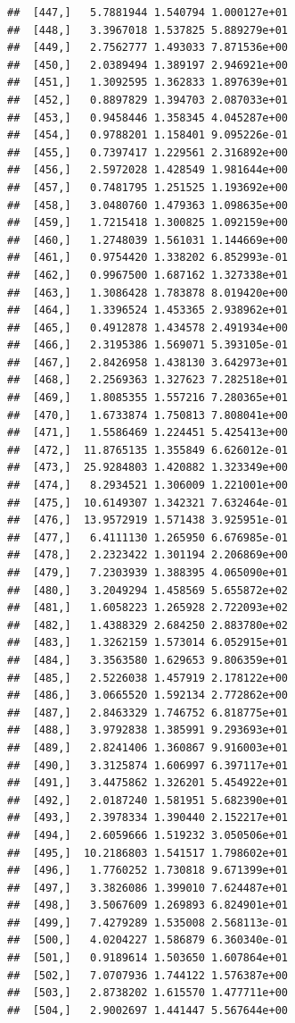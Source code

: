 \documentclass[article]{jss}\usepackage[]{graphicx}\usepackage[]{xcolor}
\makeatletter
\newenvironment{kframe}{%
 \def\at@end@of@kframe{}%
 \ifinner\ifhmode%
  \def\at@end@of@kframe{\end{minipage}}%
  \begin{minipage}{\columnwidth}%
 \fi\fi%
 \def\FrameCommand##1{\hskip\@totalleftmargin \hskip-\fboxsep
 \colorbox{shadecolor}{##1}\hskip-\fboxsep
     \hskip-\linewidth \hskip-\@totalleftmargin \hskip\columnwidth}%
 \MakeFramed {\advance\hsize-\width
   \@totalleftmargin\z@ \linewidth\hsize
   \@setminipage}}%
 {\par\unskip\endMakeFramed%
 \at@end@of@kframe}
\newenvironment{knitrout}{}{} %
\makeatother
\begin{document}
\begin{knitrout}
\begin{kframe}
\begin{verbatim}
##  [447,]   5.7881944 1.540794 1.000127e+01
##  [448,]   3.3967018 1.537825 5.889279e+01
##  [449,]   2.7562777 1.493033 7.871536e+00
##  [450,]   2.0389494 1.389197 2.946921e+00
##  [451,]   1.3092595 1.362833 1.897639e+01
##  [452,]   0.8897829 1.394703 2.087033e+01
##  [453,]   0.9458446 1.358345 4.045287e+00
##  [454,]   0.9788201 1.158401 9.095226e-01
##  [455,]   0.7397417 1.229561 2.316892e+00
##  [456,]   2.5972028 1.428549 1.981644e+00
##  [457,]   0.7481795 1.251525 1.193692e+00
##  [458,]   3.0480760 1.479363 1.098635e+00
##  [459,]   1.7215418 1.300825 1.092159e+00
##  [460,]   1.2748039 1.561031 1.144669e+00
##  [461,]   0.9754420 1.338202 6.852993e-01
##  [462,]   0.9967500 1.687162 1.327338e+01
##  [463,]   1.3086428 1.783878 8.019420e+00
##  [464,]   1.3396524 1.453365 2.938962e+01
##  [465,]   0.4912878 1.434578 2.491934e+00
##  [466,]   2.3195386 1.569071 5.393105e-01
##  [467,]   2.8426958 1.438130 3.642973e+01
##  [468,]   2.2569363 1.327623 7.282518e+01
##  [469,]   1.8085355 1.557216 7.280365e+01
##  [470,]   1.6733874 1.750813 7.808041e+00
##  [471,]   1.5586469 1.224451 5.425413e+00
##  [472,]  11.8765135 1.355849 6.626012e-01
##  [473,]  25.9284803 1.420882 1.323349e+00
##  [474,]   8.2934521 1.306009 1.221001e+00
##  [475,]  10.6149307 1.342321 7.632464e-01
##  [476,]  13.9572919 1.571438 3.925951e-01
##  [477,]   6.4111130 1.265950 6.676985e-01
##  [478,]   2.2323422 1.301194 2.206869e+00
##  [479,]   7.2303939 1.388395 4.065090e+01
##  [480,]   3.2049294 1.458569 5.655872e+02
##  [481,]   1.6058223 1.265928 2.722093e+02
##  [482,]   1.4388329 2.684250 2.883780e+02
##  [483,]   1.3262159 1.573014 6.052915e+01
##  [484,]   3.3563580 1.629653 9.806359e+01
##  [485,]   2.5226038 1.457919 2.178122e+00
##  [486,]   3.0665520 1.592134 2.772862e+00
##  [487,]   2.8463329 1.746752 6.818775e+01
##  [488,]   3.9792838 1.385991 9.293693e+01
##  [489,]   2.8241406 1.360867 9.916003e+01
##  [490,]   3.3125874 1.606997 6.397117e+01
##  [491,]   3.4475862 1.326201 5.454922e+01
##  [492,]   2.0187240 1.581951 5.682390e+01
##  [493,]   2.3978334 1.390440 2.152217e+01
##  [494,]   2.6059666 1.519232 3.050506e+01
##  [495,]  10.2186803 1.541517 1.798602e+01
##  [496,]   1.7760252 1.730818 9.671399e+01
##  [497,]   3.3826086 1.399010 7.624487e+01
##  [498,]   3.5067609 1.269893 6.824901e+01
##  [499,]   7.4279289 1.535008 2.568113e-01
##  [500,]   4.0204227 1.586879 6.360340e-01
##  [501,]   0.9189614 1.503650 1.607864e+01
##  [502,]   7.0707936 1.744122 1.576387e+00
##  [503,]   2.8738202 1.615570 1.477711e+00
##  [504,]   2.9002697 1.441447 5.567644e+00

\end{verbatim}
\end{kframe}
\end{knitrout}
\end{document}
